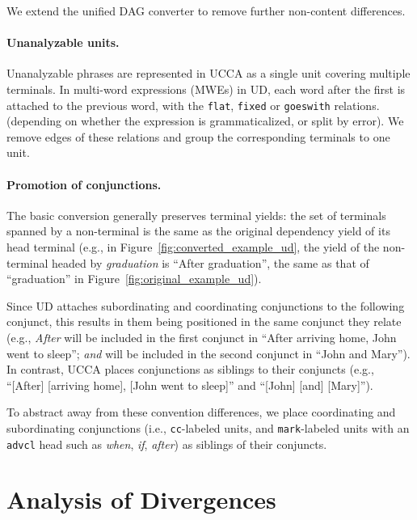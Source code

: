 \documentclass[11pt,a4paper]{article}
\begin{document}
We extend the unified DAG converter to remove further non-content differences.

\paragraph{Unanalyzable units.}
Unanalyzable phrases are represented in UCCA as a single unit covering multiple terminals.
In multi-word expressions (MWEs) in UD, each word after the first is attached to the previous word,
with the \texttt{flat}, \texttt{fixed} or \texttt{goeswith} relations.
(depending on whether the expression is grammaticalized, or split by error).
We remove edges of these relations and group the corresponding terminals to one unit.

\paragraph{Promotion of conjunctions.}
The basic conversion generally preserves terminal yields:
the set of terminals spanned by a non-terminal is the same
as the original dependency yield of its head terminal
(e.g., in Figure~\ref{fig:converted_example_ud}, the yield of the non-terminal
headed by \textit{graduation} is ``After graduation'', the same as that of ``graduation''
in Figure~\ref{fig:original_example_ud}).

Since UD attaches subordinating and coordinating conjunctions to the following conjunct,
this results in them being positioned in the same conjunct they relate (e.g.,
\textit{After} will be included in the first conjunct in ``After arriving home, John went to sleep'';
\textit{and} will be included in the second conjunct in ``John and Mary'').
In contrast, UCCA places conjunctions as siblings to their conjuncts (e.g.,
``[After] [arriving home], [John went to sleep]'' and ``[John] [and] [Mary]''). 

To abstract away from these convention differences,
we place 
coordinating and subordinating conjunctions 
(i.e., \texttt{cc}-labeled units, and \texttt{mark}-labeled units with an \texttt{advcl} head such 
as \textit{when}, \textit{if}, \textit{after}) as siblings of their conjuncts.


\section{Analysis of Divergences}\label{sec:analysis}
\end{document}
